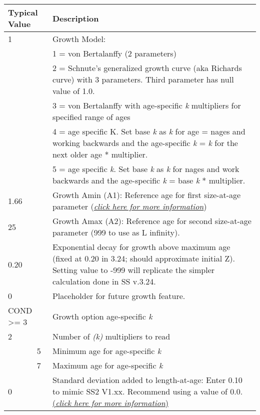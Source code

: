 	
\begin{longtable}{p{0.5cm} p{2cm} p{12cm}}
	   \multicolumn{2}{l}{Typical Value} & Description \\
	   \hline
	   1 & & Growth Model: \\
	     & & 1 = von Bertalanffy (2 parameters)\\
	     & & 2 = Schnute's generalized growth curve (aka Richards curve) with 3 parameters.  Third parameter has null value of 1.0. \\
	     & & 3 = von Bertalanffy with age-specific \textit{k} multipliers for specified range of ages\\
	     & & 4 = age specific K. Set base \textit{k} as \textit{k} for age = nages and working backwards and the age-specific \textit{k} = \textit{k} for the next older age * multiplier. \\
	     & & 5 = age specific \textit{k}. Set base \textit{k} as \textit{k} for nages and work backwards and the age-specific \textit{k} = base \textit{k} * multiplier. \\
	   \hline

	   1.66 & & Growth Amin (A1): Reference age for first size-at-age parameter (\hyperlink{A1}{\textit{click here for more information}})\\
	   \hline

	   25 & & Growth Amax (A2): Reference age for second size-at-age parameter (999 to use as L infinity).\\
	   \hline
	   
	   0.20 & & Exponential decay for growth above maximum age (fixed at 0.20 in 3.24; should approximate initial Z).   Setting value to -999 will replicate the simpler calculation done in SS v.3.24.\\
	   \hline
	   
	   0   & & Placeholder for future growth feature. \\
	   \hline

	   \multicolumn{2}{l}{COND >= 3} & Growth option age-specific \textit{k}\\
	   2 & & Number of \textit{(k)} multipliers to read\\
	   & 5 & Minimum age for age-specific \textit{k}\\
	   & 7 & Maximum age for age-specific \textit{k}\\
	   \hline

	   0 & & Standard deviation added to length-at-age: Enter 0.10 to mimic SS2 V1.xx. Recommend using a value of 0.0.  \hyperlink{A1}{(\textit{click here for more information})}\\
	   \hline


\end{longtable}
